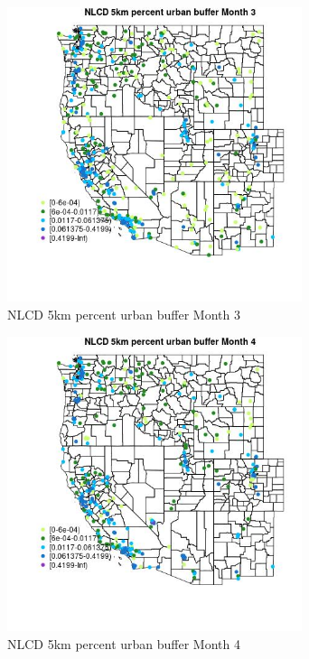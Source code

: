 \begin{figure} 
\centering  
\includegraphics[width=0.77\textwidth]{Code_Outputs/Report_ML_input_PM25_Step4_part_e_de_duplicated_aves_compiled_2019-05-18wNAs_MapObsMo3NLCD_5km_percent_urban_buffer.jpg} 
\caption{\label{fig:Report_ML_input_PM25_Step4_part_e_de_duplicated_aves_compiled_2019-05-18wNAsMapObsMo3NLCD_5km_percent_urban_buffer}NLCD 5km percent urban buffer Month 3} 
\end{figure} 
 

\begin{figure} 
\centering  
\includegraphics[width=0.77\textwidth]{Code_Outputs/Report_ML_input_PM25_Step4_part_e_de_duplicated_aves_compiled_2019-05-18wNAs_MapObsMo4NLCD_5km_percent_urban_buffer.jpg} 
\caption{\label{fig:Report_ML_input_PM25_Step4_part_e_de_duplicated_aves_compiled_2019-05-18wNAsMapObsMo4NLCD_5km_percent_urban_buffer}NLCD 5km percent urban buffer Month 4} 
\end{figure} 
 

